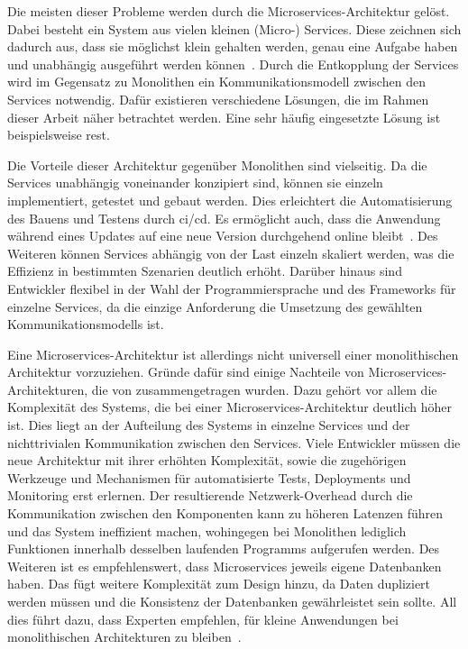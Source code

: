 Die meisten dieser Probleme werden durch die Microservices-Architektur gelöst.
Dabei besteht ein System aus vielen kleinen (Micro-) Services.
Diese zeichnen sich dadurch aus, dass sie möglichst klein gehalten werden, genau eine Aufgabe haben und unabhängig ausgeführt werden können~\cite{a-survey-on}.
Durch die Entkopplung der Services wird im Gegensatz zu Monolithen ein Kommunikationsmodell zwischen den Services notwendig.
Dafür existieren verschiedene Lösungen, die im Rahmen dieser Arbeit näher betrachtet werden.
Eine sehr häufig eingesetzte Lösung ist beispielsweise \gls{rest}.

Die Vorteile dieser Architektur gegenüber Monolithen sind vielseitig.
Da die Services unabhängig voneinander konzipiert sind, können sie einzeln implementiert, getestet und gebaut werden.
Dies erleichtert die Automatisierung des Bauens und Testens durch \gls{ci}/\gls{cd}.
Es ermöglicht auch, dass die Anwendung während eines Updates auf eine neue Version durchgehend online bleibt~\cite{a-survey-on}.
Des Weiteren können Services abhängig von der Last einzeln skaliert werden, was die Effizienz in bestimmten Szenarien deutlich erhöht.
Darüber hinaus sind Entwickler flexibel in der Wahl der Programmiersprache und des Frameworks für einzelne Services, da die einzige Anforderung die Umsetzung des gewählten Kommunikationsmodells ist.

Eine Microservices-Architektur ist allerdings nicht universell einer monolithischen Architektur vorzuziehen.
Gründe dafür sind einige Nachteile von Microservices-Architekturen, die von  zusammengetragen wurden.
Dazu gehört vor allem die Komplexität des Systems, die bei einer Microservices-Architektur deutlich höher ist.
Dies liegt an der Aufteilung des Systems in einzelne Services und der nichttrivialen Kommunikation zwischen den Services.
Viele Entwickler müssen die neue Architektur mit ihrer erhöhten Komplexität, sowie die zugehörigen Werkzeuge und Mechanismen für automatisierte Tests, Deployments und Monitoring erst erlernen.
Der resultierende Netzwerk-Overhead durch die Kommunikation zwischen den Komponenten kann zu höheren Latenzen führen und das System ineffizient machen, wohingegen bei Monolithen lediglich Funktionen innerhalb desselben laufenden Programms aufgerufen werden.
Des Weiteren ist es empfehlenswert, dass Microservices jeweils eigene Datenbanken haben.
Das fügt weitere Komplexität zum Design hinzu, da Daten dupliziert werden müssen und die Konsistenz der Datenbanken gewährleistet sein sollte.
All dies führt dazu, dass Experten empfehlen, für kleine Anwendungen bei monolithischen Architekturen zu bleiben~\cite{a-survey-on,7742218}.

